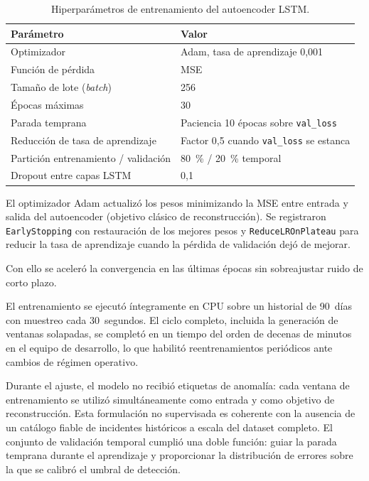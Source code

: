 \begin{table}[h]
\centering
\small
\caption{Hiperparámetros de entrenamiento del autoencoder LSTM.}
\label{tab:hiperparametros}
\begin{tabular}{@{}p{}p{}@{}}
\toprule
\textbf{Parámetro} & \textbf{Valor} \\
\midrule
Optimizador & Adam, tasa de aprendizaje 0,001 \\
Función de pérdida & MSE \\
Tamaño de lote (\textit{batch}) & 256 \\
Épocas máximas & 30 \\
Parada temprana & Paciencia 10 épocas sobre \texttt{val\_loss} \\
Reducción de tasa de aprendizaje & Factor 0,5 cuando \texttt{val\_loss} se estanca \\
Partición entrenamiento / validación & 80~\% / 20~\% temporal \\
Dropout entre capas LSTM & 0,1 \\
\bottomrule
\end{tabular}
\end{table}

El optimizador Adam actualizó los pesos minimizando la MSE entre entrada y salida del autoencoder (objetivo clásico de reconstrucción). Se registraron \texttt{EarlyStopping} con restauración de los mejores pesos y \texttt{ReduceLROnPlateau} para reducir la tasa de aprendizaje cuando la pérdida de validación dejó de mejorar.

Con ello se aceleró la convergencia en las últimas épocas sin sobreajustar ruido de corto plazo.

El entrenamiento se ejecutó íntegramente en CPU sobre un historial de 90~días con muestreo cada 30~segundos. El ciclo completo, incluida la generación de ventanas solapadas, se completó en un tiempo del orden de decenas de minutos en el equipo de desarrollo, lo que habilitó reentrenamientos periódicos ante cambios de régimen operativo.

Durante el ajuste, el modelo no recibió etiquetas de anomalía: cada ventana de entrenamiento se utilizó simultáneamente como entrada y como objetivo de reconstrucción. Esta formulación no supervisada es coherente con la ausencia de un catálogo fiable de incidentes históricos a escala del dataset completo. El conjunto de validación temporal cumplió una doble función: guiar la parada temprana durante el aprendizaje y proporcionar la distribución de errores sobre la que se calibró el umbral de detección.

